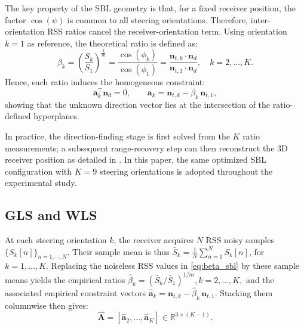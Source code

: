 \documentclass[conference]{IEEEtran}
\begin{document}
The key property of the SBL geometry is that, for a fixed receiver position, the factor $\cos(\psi)$ is common to all steering orientations. Therefore, inter-orientation RSS ratios cancel the receiver-orientation term. Using orientation $k=1$ as reference, the theoretical ratio is defined as:
\begin{equation}
    \beta_k=\left(\frac{S_{k}}{S_{1}}\right)^{\frac{1}{m}}
    =\frac{\cos(\phi_{k})}{\cos(\phi_{1})}
    =\frac{\mathbf{n}_{t,k}\cdot\mathbf{n}_d}{\mathbf{n}_{t,1}\cdot\mathbf{n}_d}
    ,\quad k=2,\ldots,K.
    \label{eq:beta_sbl}
\end{equation}
Hence, each ratio induces the homogeneous constraint:
\begin{equation}
    \mathbf{a}_k^\top\mathbf{n}_d=0,\qquad
    \mathbf{a}_k=\mathbf{n}_{t,k}-\beta_k\,\mathbf{n}_{t,1},
    \label{eq:hyperplane_constraint}
\end{equation}
showing that the unknown direction vector lies at the intersection of the ratio-defined hyperplanes. 

In practice, the direction-finding stage is first solved from the $K$ ratio measurements; a subsequent range-recovery step can then reconstruct the 3D receiver position as detailed in \cite{acuna2025model}. In this paper, the same optimized SBL configuration with $K=9$ steering orientations is adopted throughout the experimental study.

\subsection{GLS and WLS}
\label{subsec:gls_wls}

At each steering orientation $k$, the receiver acquires $N$ RSS noisy samples $\{S_k[n]\}_{n=1,\cdots,N}$. Their sample mean is thus
$\bar S_{k}=\frac{1}{N}\sum_{n=1}^{N}S_{k}[n]$, for $k=1,\ldots,K$. Replacing the noiseless RSS values in \eqref{eq:beta_sbl} by these sample means yields the empirical ratios $\hat\beta_k=\left(\bar S_{k}/\bar S_{1}\right)^{1/m}, k=2,\ldots,K,$
and the associated empirical constraint vectors $\hat{\mathbf{a}}_k=\mathbf{n}_{t,k}-\hat\beta_k\,\mathbf{n}_{t,1}$. Stacking them columnwise then gives:
\begin{equation}
    \hat{\mathbf{A}}=\left[\hat{\mathbf{a}}_2,\ldots,\hat{\mathbf{a}}_K\right]\in\mathbb{R}^{3\times(K-1)}.
    \label{eq:Ahat_sbl}
\end{equation}
\end{document}
